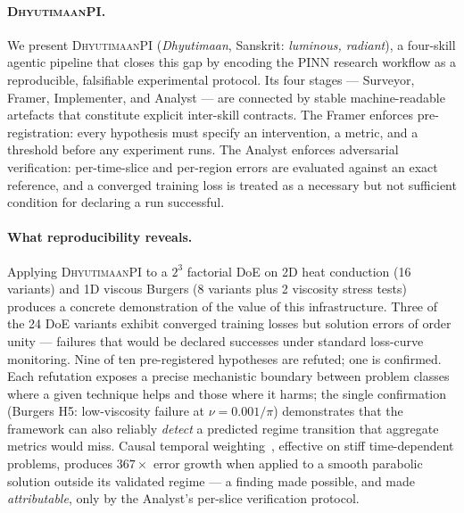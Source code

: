 \documentclass{article}
\newcommand{\dhyutimaan}{\textsc{DhyutimaanPI}}
\begin{document}
\paragraph{\dhyutimaan{}.}
We present \dhyutimaan{} (\textit{Dhyutimaan}, Sanskrit: \textit{luminous,
radiant}), a four-skill agentic pipeline that closes this gap by encoding
the PINN research workflow as a reproducible, falsifiable experimental
protocol.
Its four stages — Surveyor, Framer, Implementer, and Analyst — are
connected by stable machine-readable artefacts that constitute explicit
inter-skill contracts.
The Framer enforces pre-registration: every hypothesis must specify an
intervention, a metric, and a threshold before any experiment runs.
The Analyst enforces adversarial verification: per-time-slice and
per-region errors are evaluated against an exact reference, and a
converged training loss is treated as a necessary but not sufficient
condition for declaring a run successful.

\paragraph{What reproducibility reveals.}
Applying \dhyutimaan{} to a $2^3$ factorial DoE on 2D heat conduction
(16 variants) and 1D viscous Burgers (8 variants plus 2 viscosity stress tests)
produces a concrete demonstration of the value of this infrastructure.
Three of the 24 DoE variants exhibit converged training losses but solution
errors of order unity — failures that would be declared successes under
standard loss-curve monitoring.
Nine of ten pre-registered hypotheses are refuted; one is confirmed.
Each refutation exposes a precise mechanistic boundary between problem classes
where a given technique helps and those where it harms; the single confirmation
(Burgers H5: low-viscosity failure at $\nu=0.001/\pi$) demonstrates that the
framework can also reliably \emph{detect} a predicted regime transition that
aggregate metrics would miss.
Causal temporal weighting~\citep{wang2022causal}, effective on stiff
time-dependent problems, produces $367\times$ error growth when applied
to a smooth parabolic solution outside its validated regime — a finding
made possible, and made \emph{attributable}, only by the Analyst's
per-slice verification protocol.
\end{document}
